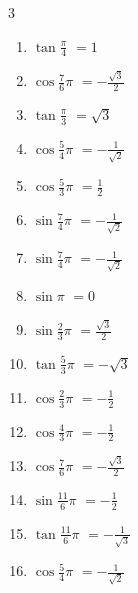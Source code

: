 \begin{multicols}{3}
\begin{enumerate}
  \item $\displaystyle \tan{\frac{\pi}{4}}$
        $\displaystyle =1$

  \item $\displaystyle \cos{\frac{7}{6}\pi}$
        $\displaystyle =-\frac{\sqrt{3}}{2}$

  \item $\displaystyle \tan{\frac{\pi}{3}}$
        $\displaystyle =\sqrt{3}$

  \item $\displaystyle \cos{\frac{5}{4}\pi}$
        $\displaystyle =-\frac{1}{\sqrt{2}}$

  \item $\displaystyle \cos{\frac{5}{3}\pi}$
        $\displaystyle =\frac{1}{2}$

  \item $\displaystyle \sin{\frac{7}{4}\pi}$
        $\displaystyle =-\frac{1}{\sqrt{2}}$

  \item $\displaystyle \sin{\frac{7}{4}\pi}$
        $\displaystyle =-\frac{1}{\sqrt{2}}$

  \item $\displaystyle \sin{\pi}$
        $\displaystyle =0$

  \item $\displaystyle \sin{\frac{2}{3}\pi}$
        $\displaystyle =\frac{\sqrt{3}}{2}$

  \item $\displaystyle \tan{\frac{5}{3}\pi}$
        $\displaystyle =-\sqrt{3}$

  \item $\displaystyle \cos{\frac{2}{3}\pi}$
        $\displaystyle =-\frac{1}{2}$

  \item $\displaystyle \cos{\frac{4}{3}\pi}$
        $\displaystyle =-\frac{1}{2}$

  \item $\displaystyle \cos{\frac{7}{6}\pi}$
        $\displaystyle =-\frac{\sqrt{3}}{2}$

\columnbreak %

  \item $\displaystyle \sin{\frac{11}{6}\pi}$
        $\displaystyle =-\frac{1}{2}$

  \item $\displaystyle \tan{\frac{11}{6}\pi}$
        $\displaystyle =-\frac{1}{\sqrt{3}}$

  \item $\displaystyle \cos{\frac{5}{4}\pi}$
        $\displaystyle =-\frac{1}{\sqrt{2}}$


\end{enumerate}
\end{multicols}

